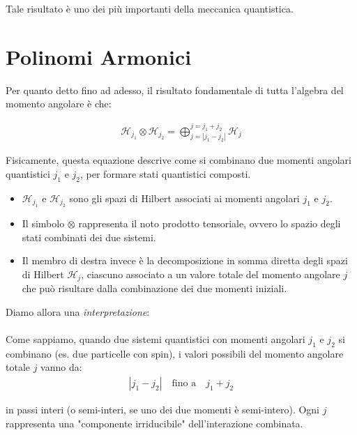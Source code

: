 	Tale risultato è uno dei più importanti della meccanica quantistica.

\section{Polinomi Armonici}

	Per quanto detto fino ad adesso, il risultato fondamentale di tutta l'algebra del momento angolare è che:
	
\begin{nb}
\begin{align*}
	\mathcal{H}_{j_1} \otimes \mathcal{H}_{j_2} = \bigoplus_{j = |j_1 - j_2|}^{j = j_1 + j_2} \mathcal{H}_j
\end{align*}
\end{nb}

\begin{myapprf}
	Fisicamente, questa equazione descrive come si combinano due momenti angolari quantistici $j_1$ e $j_2$, per formare stati quantistici composti.
\begin{itemize}
	\item $\mathcal{H}_{j_1}$ e $\mathcal{H}_{j_2}$ sono gli spazi di Hilbert associati ai momenti angolari $j_1$ e $j_2$.
	
	\item Il simbolo $\otimes$ rappresenta il noto prodotto tensoriale, ovvero lo spazio degli stati combinati dei due sistemi.
	
	\item Il membro di destra invece  è la decomposizione in somma diretta degli spazi di Hilbert $\mathcal{H}_j$, ciascuno associato a un valore totale del momento angolare $j$ che può risultare dalla combinazione dei due momenti iniziali.
\end{itemize}
	Diamo allora una \textit{interpretazione}:
	\\
	\\
	Come sappiamo, quando due sistemi quantistici con momenti angolari $j_1$ e $j_2$ si combinano (es. due particelle con spin), i valori possibili del momento angolare totale $j$ vanno da:
\begin{align*}
	|j_1 - j_2| \quad \text{fino a} \quad j_1 + j_2
\end{align*}

	in passi interi (o semi-interi, se uno dei due momenti è semi-intero). Ogni $j$ rappresenta una "componente irriducibile" dell’interazione combinata.

\end{myapprf}


